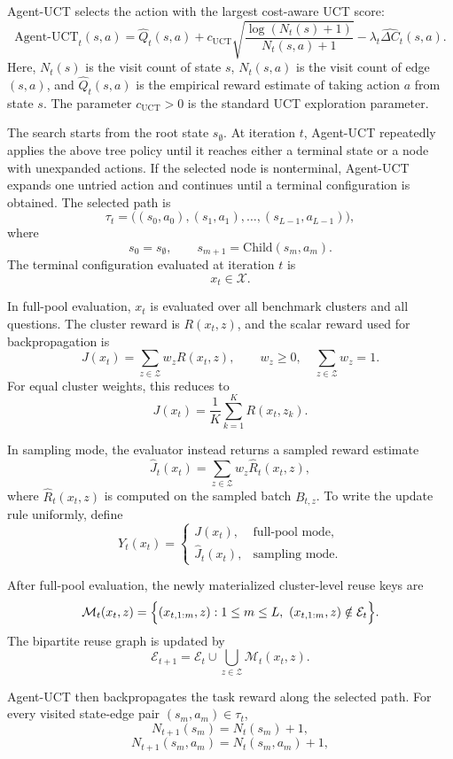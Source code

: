 \documentclass{article}
\begin{document}
Agent-UCT selects the action with the largest cost-aware UCT score:
\[
\mathrm{Agent\text{-}UCT}_t(s,a)
=
\hat Q_t(s,a)
+
c_{\mathrm{UCT}}
\sqrt{
\frac{\log(N_t(s)+1)}
{N_t(s,a)+1}
}
-
\lambda_t \widehat{\Delta C}_t(s,a) .
\]
Here, \(N_t(s)\) is the visit count of state \(s\), \(N_t(s,a)\) is the visit count of edge \((s,a)\), and \(\hat Q_t(s,a)\) is the empirical reward estimate of taking action \(a\) from state \(s\). The parameter
\(c_{\mathrm{UCT}}>0\) is the standard UCT exploration parameter.

The search starts from the root state \(s_{\emptyset}\). At iteration \(t\),
Agent-UCT repeatedly applies the above tree policy until it reaches either a terminal state or a node with unexpanded actions. If the selected node is nonterminal, Agent-UCT expands one untried action and continues until a terminal configuration is obtained.
The selected path is
\[
\tau_t
=
\bigl((s_0,a_0),(s_1,a_1),\dots,(s_{L-1},a_{L-1})\bigr),
\]
where
\[
s_0=s_{\emptyset},
\qquad
s_{m+1}=\mathrm{Child}(s_m,a_m).
\]
The terminal configuration evaluated at iteration \(t\) is 
\[
x_t\in\mathcal X.
\]

In full-pool evaluation, \(x_t\) is evaluated over all benchmark clusters and all questions. The
cluster reward is \(R(x_t,z)\), and the scalar reward used for backpropagation
is
\[
J(x_t)
=
\sum_{z\in\mathcal Z}
w_z R(x_t,z),
\qquad
w_z\ge 0,\quad \sum_{z\in\mathcal Z}w_z=1.
\]
For equal cluster weights, this reduces to
\[
J(x_t)
=
\frac{1}{K}
\sum_{k=1}^{K}
R(x_t,z_k).
\]

In sampling mode, the evaluator instead returns a sampled reward estimate
\[
\widehat J_t(x_t)
=
\sum_{z\in\mathcal Z}
w_z \widehat R_t(x_t,z),
\]
where \(\widehat R_t(x_t,z)\) is computed on the sampled batch \(B_{t,z}\). To
write the update rule uniformly, define
\[
Y_t(x_t)
=
\begin{cases}
J(x_t), & \text{full-pool mode},\\
\widehat J_t(x_t), & \text{sampling mode}.
\end{cases}
\]

After full-pool evaluation, the newly materialized cluster-level reuse keys are
\[
\mathcal M_t(x_t,z)
=
\Bigl\{
(x_{t,1:m},z):
1\le m\le L,\
(x_{t,1:m},z)\notin\mathcal E_t
\Bigr\}.
\]
The bipartite reuse graph is updated by
\[
\mathcal E_{t+1}
=
\mathcal E_t
\cup
\bigcup_{z\in\mathcal Z}
\mathcal M_t(x_t,z).
\]

Agent-UCT then backpropagates the task reward along the selected path.
For every visited state-edge pair \((s_m,a_m)\in\tau_t\),
\[
N_{t+1}(s_m)
=
N_t(s_m)+1,
\]
\[
N_{t+1}(s_m,a_m)
=
N_t(s_m,a_m)+1,
\]
\end{document}
